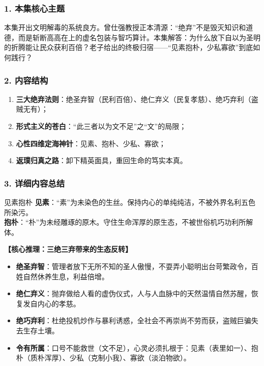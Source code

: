 \subsubsection{1. 本集核心主题}
本集开出文明解毒的系统良方。曾仕强教授正本清源：“绝弃”不是毁灭知识和道德，而是斩断高高在上的虚名包装与智巧算计。本集解答：为什么放下自以为圣明的折腾能让民众获利百倍？老子给出的终极归宿——“见素抱朴，少私寡欲”到底如何践行？

\subsubsection{2. 内容结构}
\begin{enumerate}
    \item \textbf{三大绝弃法则}：绝圣弃智（民利百倍）、绝仁弃义（民复孝慈）、绝巧弃利（盗贼无有）；
    \item \textbf{形式主义的苍白}：“此三者以为文不足”之“文”的局限；
    \item \textbf{心性四维定海神针}：见素、抱朴、少私、寡欲；
    \item \textbf{返璞归真之路}：卸下精英面具，重回生命的笃实本真。
\end{enumerate}

\subsubsection{3. 详细内容总结}

\begin{ConceptBox}{见素抱朴}
\textbf{见素}：“素”为未染色的生丝。保持内心的单纯纯洁，不被外界名利五色所染污。\\
\textbf{抱朴}：“朴”为未经雕琢的原木。守住生命浑厚的原生态，不被世俗机巧功利所解体。
\end{ConceptBox}

\noindent\textbf{【核心推理：三绝三弃带来的生态反转】}
\begin{itemize}
    \item \textbf{绝圣弃智}：管理者放下无所不知的圣人傲慢，不耍弄小聪明出台苛繁政令，百姓自然休养生息，利益倍增。
    \item \textbf{绝仁弃义}：抛弃做给人看的虚伪仪式，人与人血脉中的天然温情自然苏醒，恢复发自内心的孝慈。
    \item \textbf{绝巧弃利}：杜绝投机炒作与暴利诱惑，全社会不再崇尚不劳而获，盗贼巨骗失去生存土壤。
    \item \textbf{令有所属}：口号不能救世（文不足），心灵必须扎根于：见素（表里如一）、抱朴（质朴浑厚）、少私（克制小我）、寡欲（淡泊物欲）。
\end{itemize}

